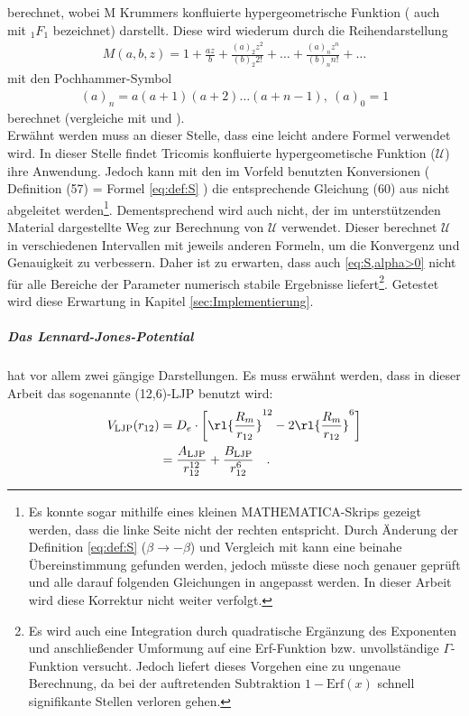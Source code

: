 %
berechnet, wobei M Krummers konfluierte hypergeometrische Funktion ( auch mit 
$_1F_1$ bezeichnet) darstellt. Diese wird wiederum durch die 
Reihendarstellung 
%
\begin{align}\label{eq:reihe_M_kon.hyp.geo}
M(a,b,z)=1+\frac{az}{b}+\frac{(a)_2z^2}{(b)_2 
2!}+\dots +\frac{(a)_nz^n}{(b)_nn!}+\dots
\end{align}
mit den Pochhammer-Symbol
\begin{align}
(a)_n=a(a+1)(a+2)\dots(a+n-1), \ (a)_0=1
\end{align}
% 
berechnet (vergleiche mit \cite{b:1a} und \cite{b:6a}).\\
Erwähnt werden muss an dieser Stelle, dass \cite{av:1a} eine leicht andere 
Formel verwendet wird. In dieser Stelle findet Tricomis 
konfluierte 
hypergeometische Funktion 
($\mathcal{U}$) ihre Anwendung. Jedoch kann mit den im 
Vorfeld benutzten 
Konversionen  ( Definition (57) = Formel \ref{eq:def:S} ) die entsprechende 
Gleichung (60) aus \cite{av:1a} nicht abgeleitet werden\footnote{Es 
konnte 
sogar mithilfe eines kleinen MATHEMATICA-Skrips gezeigt werden, dass 
die linke 
Seite nicht der rechten entspricht. Durch Änderung der Definition 
\ref{eq:def:S} ($\beta\rightarrow-\beta$) und Vergleich mit 
\cite{b:6a} kann 
eine beinahe Übereinstimmung gefunden werden, jedoch müsste 
diese noch 
genauer 
geprüft und alle darauf folgenden Gleichungen in \cite{av:1a} 
angepasst werden. 
In dieser Arbeit wird diese Korrektur nicht weiter 
verfolgt.}. 
Dementsprechend wird 
auch nicht, der im unterstützenden Material \cite{av:1a2} 
dargestellte 
Weg zur Berechnung von $\mathcal{U}$ verwendet. Dieser berechnet $\mathcal{U}$ 
in verschiedenen Intervallen mit jeweils anderen Formeln, um die Konvergenz und 
Genauigkeit zu verbessern. Daher ist zu erwarten, dass auch 
\ref{eq:S,alpha>0} nicht für alle Bereiche der Parameter numerisch stabile 
Ergebnisse liefert\footnote{Es wird auch eine Integration 
durch quadratische 
Ergänzung des Exponenten und anschließender Umformung auf eine Erf-Funktion 
bzw. unvollständige $\Gamma$-Funktion 
versucht. Jedoch liefert dieses Vorgehen eine zu ungenaue 
Berechnung, da bei 
der auftretenden Subtraktion $1-\text{Erf}(x)$ schnell 
signifikante Stellen verloren gehen.}. Getestet wird diese Erwartung in Kapitel 
\ref{sec:Implementierung}. %
%
%
%
\subparagraph{Das Lennard-Jones-Potential} hat vor allem zwei gängige 
Darstellungen. Es muss erwähnt werden, dass in dieser Arbeit das sogenannte 
(12,6)-LJP benutzt wird:
%
\begin{align}\label{eq:def:LJP}
V_{\text{LJP}}(r_{12})&=D_e\cdot\left[ \rl{\frac{R_m}{r_{12}}}^{12} - 
2\rl{\frac{R_m}{r_{12}}}^6 \right]\\
                      &= 
                      \frac{A_\text{LJP}}{r_{12}^{12}}+\frac{B_\text{LJP}}{r^6_{12}}
                       \quad.
\end{align}
